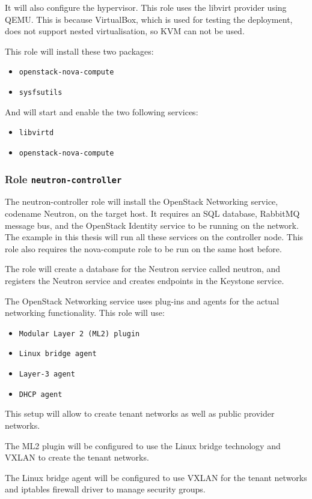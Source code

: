 It will also configure the hypervisor. This role uses the libvirt provider using QEMU. This is because VirtualBox, which is used for testing the deployment, does not support nested virtualisation, so KVM can not be used.

This role will install these two packages:
\begin{itemize}
  \item{\texttt{openstack-nova-compute}}
  \item{\texttt{sysfsutils}}
\end{itemize}
And will start and enable the two following services:
\begin{itemize}
  \item{\texttt{libvirtd}}
  \item{\texttt{openstack-nova-compute}}
\end{itemize}

\subsubsection*{Role \texttt{neutron-controller}}
The neutron-controller role will install the OpenStack Networking service, codename Neutron, on the target host. It requires an SQL database, RabbitMQ message bus, and the OpenStack Identity service to be running on the network. The example in this thesis will run all these services on the controller node. This role also requires the nova-compute role to be run on the same host before.

The role will create a database for the Neutron service called neutron, and registers the Neutron service and creates endpoints in the Keystone service.

The OpenStack Networking service uses plug-ins and agents for the actual networking functionality. This role will use:
\begin{itemize}
  \item{\texttt{Modular Layer 2 (ML2) plugin}}
  \item{\texttt{Linux bridge agent}}
  \item{\texttt{Layer-3 agent}}
  \item{\texttt{DHCP agent}}
\end{itemize}
This setup will allow to create tenant networks as well as public provider networks.

The ML2 plugin will be configured to use the Linux bridge technology and VXLAN to create the tenant networks.

The Linux bridge agent will be configured to use VXLAN for the tenant networks and iptables firewall driver to manage security groups.

